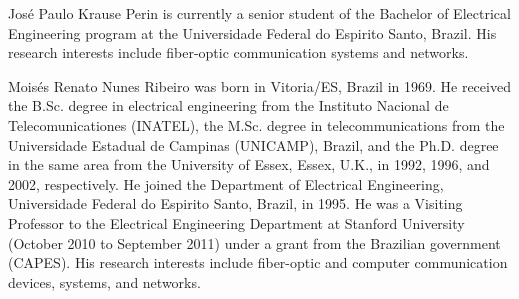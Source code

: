 \documentclass[journal]{IEEEtran}
\begin{document}


\begin{IEEEbiographynophoto}{José Paulo Krause Perin}
is currently a senior student of the Bachelor of Electrical Engineering program at the Universidade Federal do Espirito Santo, Brazil. His research interests include fiber-optic communication systems and networks.
\end{IEEEbiographynophoto}
\begin{IEEEbiographynophoto}{Moisés Renato Nunes Ribeiro}
was born in Vitoria/ES, Brazil in 1969. He received the B.Sc. degree in electrical engineering from the Instituto Nacional de Telecomunicationes (INATEL), the M.Sc. degree in telecommunications from the Universidade Estadual de Campinas (UNICAMP), Brazil, and the Ph.D. degree in the same area from the University
of Essex, Essex, U.K., in 1992, 1996, and 2002, respectively.
He joined the Department of Electrical Engineering, Universidade Federal do Espirito Santo, Brazil, in 1995. He was a Visiting Professor to the Electrical Engineering Department at Stanford University (October 2010 to September 2011) under a grant from the Brazilian government (CAPES). His research interests include fiber-optic and computer communication devices, systems, and networks.
\end{IEEEbiographynophoto}
\end{document}
